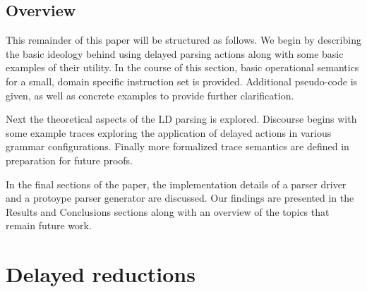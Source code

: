 \documentclass[envcountsame,runningheads]{llncs}
\begin{document}


\subsection{Overview}
This remainder of this paper will be structured as follows. 
We begin by describing the basic ideology behind using delayed parsing actions along with some basic examples of their utility.
In the course of this section, basic operational semantics for a small, domain specific instruction set is provided.
Additional pseudo-code is given, as well as concrete examples to provide further clarification.

Next the theoretical aspects of the LD parsing is explored.
Discourse begins with some example traces exploring the application of delayed actions in various grammar configurations. 
Finally more formalized trace semantics are defined in preparation for future proofs.

In the final sections of the paper, the implementation details of a parser driver and a protoype parser generator are discussed.
Our findings are presented in the Results and Conclusions sections along with an overview of the topics that remain future work.

\section{Delayed reductions}
\end{document}
